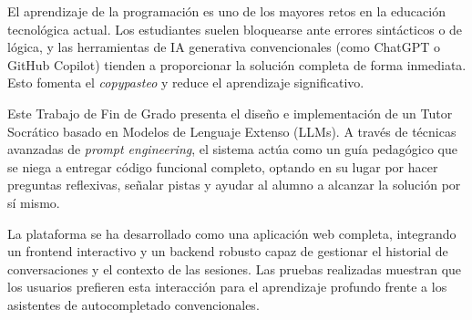El aprendizaje de la programación es uno de los mayores retos en la educación tecnológica actual. Los estudiantes suelen bloquearse ante errores sintácticos o de lógica, y las herramientas de IA generativa convencionales (como ChatGPT o GitHub Copilot) tienden a proporcionar la solución completa de forma inmediata. Esto fomenta el \textit{copypasteo} y reduce el aprendizaje significativo.

Este Trabajo de Fin de Grado presenta el diseño e implementación de un Tutor Socrático basado en Modelos de Lenguaje Extenso (LLMs). A través de técnicas avanzadas de \textit{prompt engineering}, el sistema actúa como un guía pedagógico que se niega a entregar código funcional completo, optando en su lugar por hacer preguntas reflexivas, señalar pistas y ayudar al alumno a alcanzar la solución por sí mismo.

La plataforma se ha desarrollado como una aplicación web completa, integrando un frontend interactivo y un backend robusto capaz de gestionar el historial de conversaciones y el contexto de las sesiones. Las pruebas realizadas muestran que los usuarios prefieren esta interacción para el aprendizaje profundo frente a los asistentes de autocompletado convencionales.
